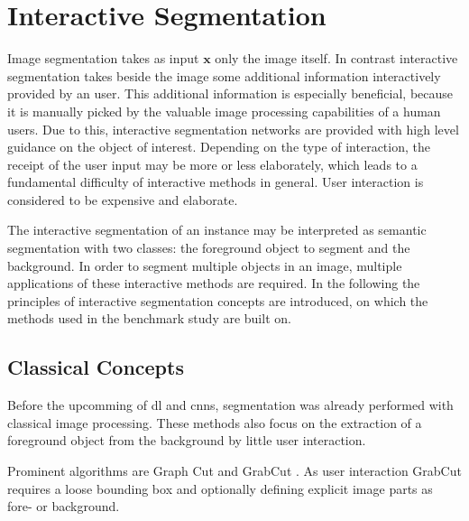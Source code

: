 
\section{Interactive Segmentation}\label{ord:ch2:sec3}

Image segmentation takes as input $\textbf{x}$ only the image itself.
In contrast interactive segmentation takes beside the image some additional information interactively provided by an user.
This additional information is especially beneficial, because it is manually picked by the valuable image processing capabilities of a human users.
Due to this, interactive segmentation networks are provided with high level guidance on the object of interest.
Depending on the type of interaction, the receipt of the user input may be more or less elaborately, which leads to a fundamental difficulty of interactive methods in general.
User interaction is considered to be expensive and elaborate.

The interactive segmentation of an instance may be interpreted as semantic segmentation with two classes: the foreground object to segment and the background.
In order to segment multiple objects in an image, multiple applications of these interactive methods are required.
In the following the principles of interactive segmentation concepts are introduced, on which the methods used in the benchmark study are built on.

\subsection{Classical Concepts}\label{ord:ch2:sec3:subsec1}
Before the upcomming of \gls{dl} and \glspl{cnn}, segmentation was already performed with classical image processing.
These methods also focus on the extraction of a foreground object from the background by little user interaction.

Prominent algorithms are Graph Cut \cite{BJ01-GraphCut} and GrabCut \cite{RKB04-GrabCut}.
As user interaction GrabCut requires a loose bounding box and optionally defining explicit image parts as fore- or background.

